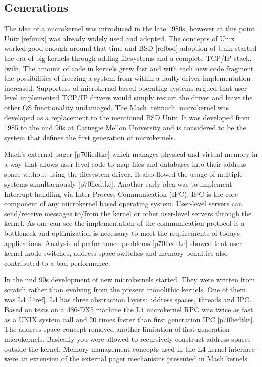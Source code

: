 \documentclass{acm_proc_article-sp}
\begin{document}
\subsection{Generations}
The idea of a microkernel was introduced in the late 1980s, however at this point Unix [refunix]
was already widely used and adopted.
The concepts of Unix worked good enough around that time and BSD [refbsd] adoption of Unix started
the era of big kernels through adding filesystems and a complete TCP/IP stack. [wiki]
The amount of code in kernels grew fast and with each new code fragment the possibilities of
freezing a system from within a faulty driver implementation increased.
Supporters of microkernel based operating systems argued that user-level implemented TCP/IP drivers
would simply restart the driver and leave the other OS functionality undamaged.
The Mach [refmach] microkernel was developed as a replacement to the mentioned BSD Unix.
It was developed from 1985 to the mid 90s at Carnegie Mellon University and is considered to be
the system that defines the first generation of microkernels.

Mach's external pager [p70liedtke] which manages physical and virtual memory in a way that allows
user-level code to map files and databases into their address space without using the filesystem
driver.
It also llowed the usage of multiple systems simultaenously [p70liedtke].
Another early idea was to implement Interrupt handling via Inter Process Communication (IPC).
IPC is the core component of any microkernel based operating system.
User-level servers can send/receive messages to/from the kernel or other user-level servers
through the kernel.
As one can see the implementation of the communication protocol is a bottleneck and optimization
is necessary to meet the requirements of todays applications.
Analysis of performance problems [p70liedtke] showed that user-kernel-mode switches, address-space
switches and memory penalties also contributed to a bad performance.

In the mid 90s development of new microkernels started.
They were written from scratch rather than evolving from the present monolithic kernels.
One of them was L4 [l4ref].
L4 has three abstraction layers: address spaces, threads and IPC.
Based on tests on a 486-DX5 machine the L4 microkernel RPC was twice as fast as a UNIX system call
and 20 times faster than first generation IPC [p70liedtke].
The address space concept removed another limitation of first generation microkernels.
Basically you were allowed to recursively construct address spaces outside the kernel.
Memory management concepts used in the L4 kernel interface were an extension of the external
pager mechanisms presented in Mach kernels.
\end{document}
